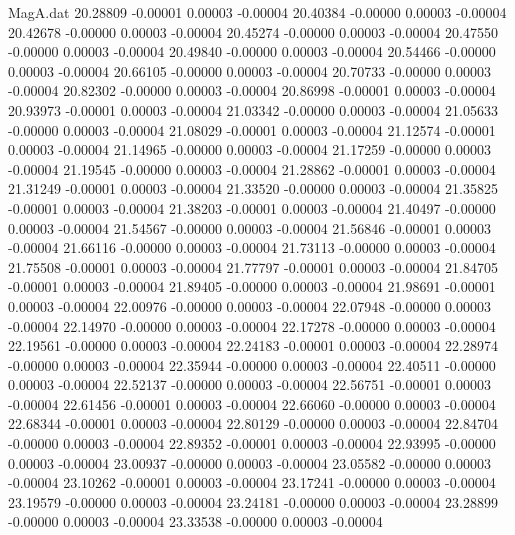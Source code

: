 \begin{filecontents}{MagA.dat}
  20.28809   -0.00001    0.00003   -0.00004
  20.40384   -0.00000    0.00003   -0.00004
  20.42678   -0.00000    0.00003   -0.00004
  20.45274   -0.00000    0.00003   -0.00004
  20.47550   -0.00000    0.00003   -0.00004
  20.49840   -0.00000    0.00003   -0.00004
  20.54466   -0.00000    0.00003   -0.00004
  20.66105   -0.00000    0.00003   -0.00004
  20.70733   -0.00000    0.00003   -0.00004
  20.82302   -0.00000    0.00003   -0.00004
  20.86998   -0.00001    0.00003   -0.00004
  20.93973   -0.00001    0.00003   -0.00004
  21.03342   -0.00000    0.00003   -0.00004
  21.05633   -0.00000    0.00003   -0.00004
  21.08029   -0.00001    0.00003   -0.00004
  21.12574   -0.00001    0.00003   -0.00004
  21.14965   -0.00000    0.00003   -0.00004
  21.17259   -0.00000    0.00003   -0.00004
  21.19545   -0.00000    0.00003   -0.00004
  21.28862   -0.00001    0.00003   -0.00004
  21.31249   -0.00001    0.00003   -0.00004
  21.33520   -0.00000    0.00003   -0.00004
  21.35825   -0.00001    0.00003   -0.00004
  21.38203   -0.00001    0.00003   -0.00004
  21.40497   -0.00000    0.00003   -0.00004
  21.54567   -0.00000    0.00003   -0.00004
  21.56846   -0.00001    0.00003   -0.00004
  21.66116   -0.00000    0.00003   -0.00004
  21.73113   -0.00000    0.00003   -0.00004
  21.75508   -0.00001    0.00003   -0.00004
  21.77797   -0.00001    0.00003   -0.00004
  21.84705   -0.00001    0.00003   -0.00004
  21.89405   -0.00000    0.00003   -0.00004
  21.98691   -0.00001    0.00003   -0.00004
  22.00976   -0.00000    0.00003   -0.00004
  22.07948   -0.00000    0.00003   -0.00004
  22.14970   -0.00000    0.00003   -0.00004
  22.17278   -0.00000    0.00003   -0.00004
  22.19561   -0.00000    0.00003   -0.00004
  22.24183   -0.00001    0.00003   -0.00004
  22.28974   -0.00000    0.00003   -0.00004
  22.35944   -0.00000    0.00003   -0.00004
  22.40511   -0.00000    0.00003   -0.00004
  22.52137   -0.00000    0.00003   -0.00004
  22.56751   -0.00001    0.00003   -0.00004
  22.61456   -0.00001    0.00003   -0.00004
  22.66060   -0.00000    0.00003   -0.00004
  22.68344   -0.00001    0.00003   -0.00004
  22.80129   -0.00000    0.00003   -0.00004
  22.84704   -0.00000    0.00003   -0.00004
  22.89352   -0.00001    0.00003   -0.00004
  22.93995   -0.00000    0.00003   -0.00004
  23.00937   -0.00000    0.00003   -0.00004
  23.05582   -0.00000    0.00003   -0.00004
  23.10262   -0.00001    0.00003   -0.00004
  23.17241   -0.00000    0.00003   -0.00004
  23.19579   -0.00000    0.00003   -0.00004
  23.24181   -0.00000    0.00003   -0.00004
  23.28899   -0.00000    0.00003   -0.00004
  23.33538   -0.00000    0.00003   -0.00004

\end{filecontents}
